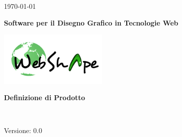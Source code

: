 
\title{\TITOLODOC}
\author{Piero Bizzotto}



\renewcommand{\insertversion}{0.0} %
\renewcommand{\TITOLODOC}{Definizione di Prodotto} %
\renewcommand{\glosspath}{.\glossario} %

\begin{titlepage}
\begin{center}
	\begin{Large}	\today \end{Large}
\end{center}

\vspace{20pt}

\begin{center}
	\begin{Huge}
				\textbf{\ajax}
	\end{Huge}
\end{center}			

\begin{center}
	\begin{large}
				\textbf{Software per il Disegno Grafico in Tecnologie Web}
	\end{large}
\end{center}			

\vspace{20pt}

\begin{center}
\includegraphics[width=150pt]{../logo/logo}
\end{center}

\vspace{170pt}
\begin{center} %
	\begin{Huge}
				\textbf{\TITOLODOC}
	\end{Huge}
			\\
\end{center}
\vspace{210pt}
\begin{center}
Versione: \insertversion
\end{center}
\end{titlepage}

